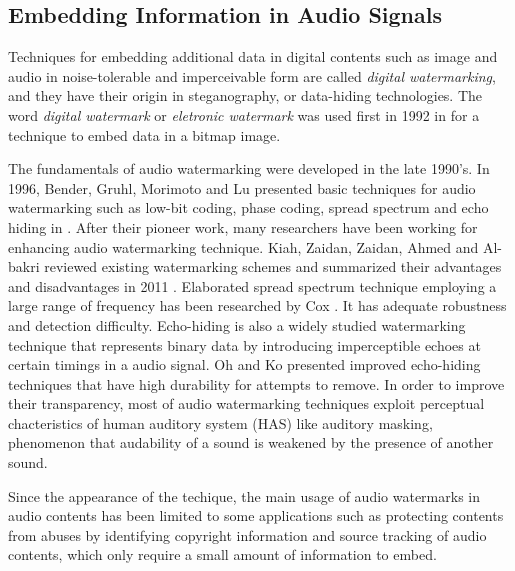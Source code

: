 \subsection{Embedding Information in Audio Signals}
Techniques for embedding additional data in digital contents such as image and audio in noise-tolerable and imperceivable form are called {\it digital watermarking}, and they have their origin in steganography, or data-hiding technologies.
The word {\it digital watermark} or {\it eletronic watermark} was used first in 1992 in \cite{tirkel1993electronic} for a technique to embed data in a bitmap image.

The fundamentals of audio watermarking were developed in the late 1990's.
In 1996, Bender, Gruhl, Morimoto and Lu presented basic techniques for audio watermarking such as low-bit coding, phase coding, spread spectrum and echo hiding in \cite{bender1996techniques}.
After their pioneer work, many researchers have been working for enhancing audio watermarking technique.
Kiah, Zaidan, Zaidan, Ahmed and Al-bakri reviewed existing watermarking schemes and summarized their advantages and disadvantages in 2011 \cite{mat2011review}.
Elaborated spread spectrum technique employing a large range of frequency has been researched by Cox \cite{cox1997secure,cox2001digital}. It has adequate robustness and detection difficulty.
Echo-hiding is also a widely studied watermarking technique that represents binary data by introducing imperceptible echoes at certain timings in a audio signal. Oh \cite{oh2001new} and Ko \cite{ko2005time} presented improved echo-hiding techniques that have high durability for attempts to remove.
In order to improve their transparency, most of audio watermarking techniques exploit perceptual chacteristics of human auditory system (HAS) like auditory masking, phenomenon that audability of a sound is weakened by the presence of another sound.

Since the appearance of the techique, the main usage of audio watermarks in audio contents has been limited to some applications such as protecting contents from abuses by identifying copyright information and source tracking of audio contents, which only require a small amount of information to embed.

